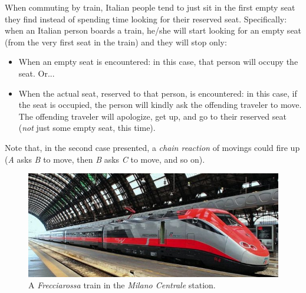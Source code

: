 \usepackage{xcolor}
\usepackage{afterpage}
\usepackage{pifont,mdframed}
\usepackage[bottom]{footmisc}

\makeatletter
\gdef\this@inputfilename{input.txt}
\gdef\this@outputfilename{output.txt}
\makeatother

\newcommand{\inputfile}{\texttt{input.txt}}
\newcommand{\outputfile}{\texttt{output.txt}}

\newenvironment{warning}
  {\par\begin{mdframed}[linewidth=2pt,linecolor=gray]%
    \begin{list}{}{\leftmargin=1cm
                   \labelwidth=\leftmargin}\item[\Large\ding{43}]}
  {\end{list}\end{mdframed}\par}

	When commuting by train, Italian people tend to just sit in the first empty seat they find instead of spending time looking for their reserved seat. Specifically: when an Italian person boards a train, he/she will start looking for an empty seat (from the very first seat in the train) and they will stop only:

    \begin{itemize}
        \item When an empty seat is encountered: in this case, that person will occupy the seat. Or...
        \item When the actual seat, reserved to that person, is encountered: in this case, if the seat is occupied, the person will kindly ask the offending traveler to move. The offending traveler will apologize, get up, and go to their reserved seat (\emph{not} just some empty seat, this time).
    \end{itemize}

    Note that, in the second case presented, a \emph{chain reaction} of movings could fire up (\emph{A} asks \emph{B} to move, then \emph{B} asks \emph{C} to move, and so on).

    \begin{figure}[H]
        \centering
        \includegraphics[width=0.9\linewidth]{treno.jpg}
        \caption{A \emph{Frecciarossa} train in the \emph{Milano Centrale} station.}
    \end{figure}

